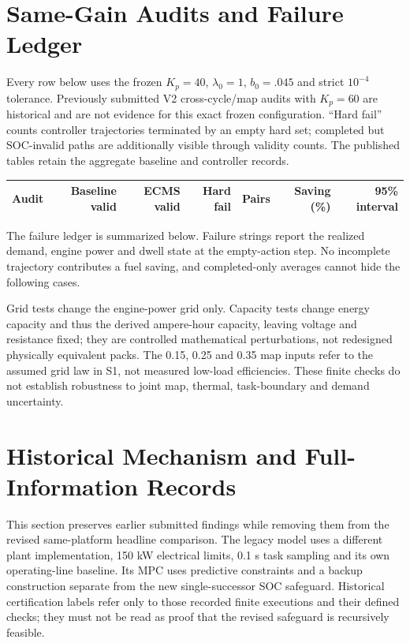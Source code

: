 \documentclass[11pt,a4paper]{article}
\begin{document}
\section{Same-Gain Audits and Failure Ledger}
Every row below uses the frozen $K_p=40$, $\lambda_0=1$, $b_0=.045$ and strict $10^{-4}$ tolerance. Previously submitted V2 cross-cycle/map audits with $K_p=60$ are historical and are not evidence for this exact frozen configuration. ``Hard fail'' counts controller trajectories terminated by an empty hard set; completed but SOC-invalid paths are additionally visible through validity counts. The published tables retain the aggregate baseline and controller records.
\begin{center}\scriptsize\begin{tabularx}{\linewidth}{@{}Xrrrrrr@{}}\toprule
Audit & Baseline valid & ECMS valid & Hard fail & Pairs & Saving (\%) & 95\% interval\\\midrule

\end{tabularx}\end{center}
The failure ledger is summarized below. Failure strings report the realized demand, engine power and dwell state at the empty-action step. No incomplete trajectory contributes a fuel saving, and completed-only averages cannot hide the following cases.
\begin{itemize}[leftmargin=*,itemsep=2pt]\small\end{itemize}
Grid tests change the engine-power grid only. Capacity tests change energy capacity and thus the derived ampere-hour capacity, leaving voltage and resistance fixed; they are controlled mathematical perturbations, not redesigned physically equivalent packs. The 0.15, 0.25 and 0.35 map inputs refer to the assumed grid law in S1, not measured low-load efficiencies. These finite checks do not establish robustness to joint map, thermal, task-boundary and demand uncertainty.

\section{Historical Mechanism and Full-Information Records}
This section preserves earlier submitted findings while removing them from the revised same-platform headline comparison. The legacy model uses a different plant implementation, 150 kW electrical limits, 0.1 s task sampling and its own operating-line baseline. Its MPC uses predictive constraints and a backup construction separate from the new single-successor SOC safeguard. Historical certification labels refer only to those recorded finite executions and their defined checks; they must not be read as proof that the revised safeguard is recursively feasible.
\end{document}
